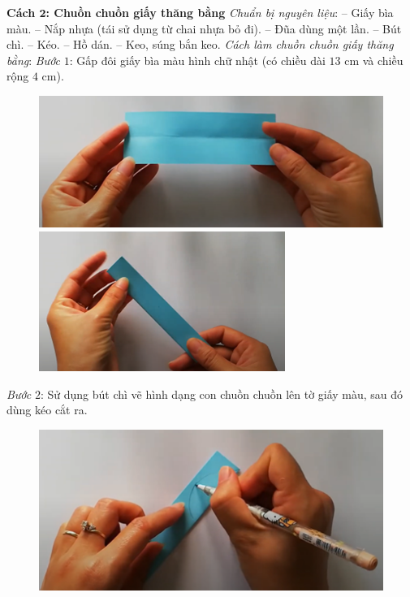 \begin{multicols}{2}
\begin{figure}[H]
		\vspace*{-10pt}
	\end{figure}
	\textbf{\color{toancuabi}Cách $\pmb{2}$: Chuồn chuồn giấy thăng bằng}
	\vskip 0.1cm
	\textit{Chuẩn bị nguyên liệu}:
	\vskip 0.1cm
	-- Giấy bìa màu.
	\vskip 0.1cm
	-- Nắp nhựa (tái sử dụng từ chai nhựa bỏ đi).
	\vskip 0.1cm
	-- Đũa dùng một lần.
	\vskip 0.1cm
	-- Bút chì.
	\vskip 0.1cm
	-- Kéo.
	\vskip 0.1cm
	-- Hồ dán.
	\vskip 0.1cm
	-- Keo, súng bắn keo.
	\vskip 0.1cm
	\textit{Cách làm chuồn chuồn giấy thăng bằng}:
	\vskip 0.1cm
	\textit{Bước} $1$: Gấp đôi giấy bìa màu hình chữ nhật (có chiều dài $13$ cm và chiều rộng $4$ cm).
	\begin{figure}[H]
		\vspace*{-5pt}
		\centering
		\captionsetup{labelformat= empty, justification=centering}
		\includegraphics[width= 1\linewidth]{62}
		\includegraphics[width= 1\linewidth]{63}
		\vspace*{-10pt}
	\end{figure}
	\textit{Bước} $2$: Sử dụng bút chì vẽ hình dạng con chuồn chuồn lên tờ giấy màu, sau đó dùng kéo cắt ra.
	\begin{figure}[H]
		\vspace*{-5pt}
		\centering
		\captionsetup{labelformat= empty, justification=centering}
		\includegraphics[width= 1\linewidth]{64}

\end{figure}
\end{multicols}
